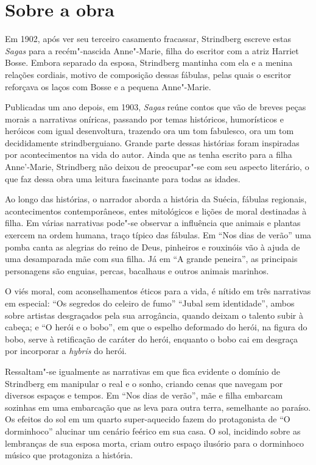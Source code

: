 \section{Sobre a obra}

Em 1902, após ver seu terceiro casamento fracassar, Strindberg escreve estas \textit{Sagas} para a recém"-nascida Anne"-Marie, filha do escritor com a atriz Harriet Bosse. Embora separado da esposa, Strindberg mantinha com ela e a menina relações
cordiais, motivo de composição dessas fábulas, pelas quais o escritor reforçava os laços com Bosse e a pequena Anne"-Marie.

Publicadas um ano depois, em 1903, \textit{Sagas} reúne contos que vão de breves peças morais a narrativas oníricas, passando por temas históricos, humorísticos e heróicos com igual desenvoltura, trazendo ora um tom fabulesco, ora um tom decididamente strindberguiano. Grande parte dessas histórias 
foram inspiradas por acontecimentos na vida do autor. Ainda que as tenha escrito para a filha Anne'-Marie, Strindberg não deixou de preocupar"-se com seu aspecto literário, o que faz dessa obra uma leitura fascinante para todas as idades.

Ao longo das histórias, o narrador aborda a história da Suécia, fábulas regionais, acontecimentos contemporâneos, entes mitológicos e lições de moral destinadas à filha. Em várias narrativas pode"-se observar a influência que animais e plantas exercem na ordem humana, traço típico das fábulas. Em ``Nos dias de verão'' uma pomba canta as alegrias do reino de Deus, pinheiros e rouxinóis vão à ajuda de uma desamparada mãe com sua filha. Já em ``A grande peneira'', as principais personagens são enguias, percas, bacalhaus e outros animais marinhos. 

O viés moral, com aconselhamentos éticos para a vida, é nítido em três narrativas em especial: ``Os segredos do celeiro de fumo'' ``Jubal sem identidade'', ambos sobre artistas desgraçados pela sua arrogância, quando deixam o talento subir à cabeça; e ``O herói e o bobo'', em que o espelho deformado do herói, na figura do bobo, serve à retificação de caráter do herói, enquanto o bobo cai em desgraça por incorporar a \emph{hybris} do herói.

Ressaltam"-se igualmente as narrativas em que fica evidente o domínio de Strindberg em manipular o real e o sonho, criando cenas que navegam por diversos espaços e tempos. Em ``Nos dias de verão'', mãe e filha embarcam sozinhas em uma embarcação que as leva para outra terra, semelhante ao paraíso. Os efeitos do sol em um quarto super-aquecido fazem do protagonista de ``O dorminhoco'' alucinar um cenário feérico em sua casa. O sol, incidindo sobre as lembranças de sua esposa morta, criam outro espaço ilusório para o dorminhoco músico que protagoniza a história.

